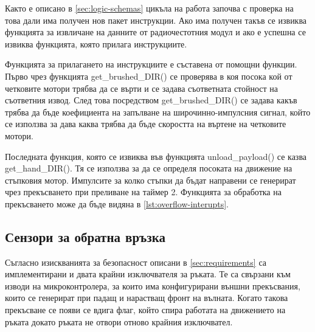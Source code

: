 Както е описано в \cref{sec:logic-schemas} цикъла на работа започва с проверка на това дали има получен нов пакет инструкции. Ако има получен такъв се извиква функцията за извличане на данните от радиочестотния модул и ако е успешна се извиква функцията, която прилага инструкциите.



Функцията за прилагането на инструкциите е съставена от помощни функции. Първо чрез функцията get\_brushed\_DIR() се проверява в коя посока кой от четковите мотори трябва да се върти и се задава съответната стойност на съответния извод. След това посредством get\_brushed\_DIR() се задава какъв трябва да бъде коефициента на запълване на широчинно-импулсния сигнал, който се използва за дава каква трябва да бъде скоростта на въртене на четковите мотори.



Последната функция, която се извиква във функцията unload\_payload() се казва get\_hand\_DIR(). Тя се използва за да се определя посоката на движение на стъпковия мотор. Импулсите за колко стъпки да бъдат направени се генерират чрез прекъсването при преливане на таймер 2. Функцията за обработка на прекъсването може да бъде видяна в \cref{lst:overflow-interupts}.




\subsection{Сензори за обратна връзка}
\label{ssec:feedback-sensors}

Съгласно изискванията за безопасност описани в \cref{sec:requirements} са имплементирани и двата крайни изключвателя за ръката. Те са свързани към изводи на микроконтролера, за които има конфигурирани външни прекъсвания, които се генерират при падащ и нарастващ фронт на вълната. Когато такова прекъсване се появи се вдига флаг, който спира работата на движението на ръката докато ръката не отвори отново крайния изключвател. 

